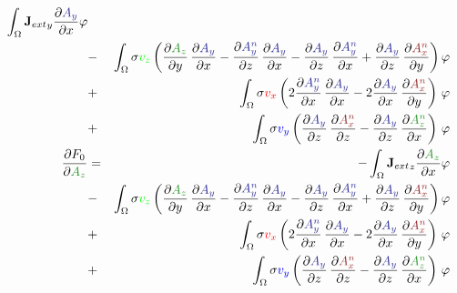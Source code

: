 \documentclass[smallextended]{svjour3}       %
\begin{document}
\begin{eqnarray}
			\int_{\Omega} {\mathbf{J}_{ext}}_y \frac{\partial \textcolor{darkBlue}{A_y}}{\partial x} \varphi
			\nonumber \\
			& - & \int_{\Omega} \sigma \textcolor{green}{v_z} \left(\frac{\partial \textcolor{darkGreen}{A_z}}{\partial y}\,\frac{\partial \textcolor{darkBlue}{A_y}}{\partial x} - \frac{\partial \textcolor{darkBlue}{A_y^n}}{\partial z}\,\frac{\partial \textcolor{darkBlue}{A_y}}{\partial x} - \frac{\partial \textcolor{darkBlue}{A_y}}{\partial z}\,\frac{\partial \textcolor{darkBlue}{A_y^n}}{\partial x} + \frac{\partial \textcolor{darkBlue}{A_y}}{\partial z}\,\frac{\partial \textcolor{darkRed}{A_x^n}}{\partial y} \right) \varphi \nonumber \\			
			& + &\int_{\Omega} \sigma \textcolor{red}{v_x} \left(2 \frac{\partial \textcolor{darkBlue}{A_y^n}}{\partial x}\,\frac{\partial \textcolor{darkBlue}{A_y}}{\partial x} - 2 \frac{\partial \textcolor{darkBlue}{A_y}}{\partial x}\,\frac{\partial \textcolor{darkRed}{A_x^n}}{\partial y}\right)\, \varphi \nonumber \\		
			& + & \int_{\Omega} \sigma \textcolor{blue}{v_y} \left(\frac{\partial \textcolor{darkBlue}{A_y}}{\partial z}\,\frac{\partial \textcolor{darkRed}{A_x^n}}{\partial z} - \frac{\partial \textcolor{darkBlue}{A_y}}{\partial z}\,\frac{\partial \textcolor{darkGreen}{A_z^n}}{\partial x} \right)\, \varphi \\			
			\frac{\partial F_0}{\partial \textcolor{darkGreen}{A_z}} & = &
			-\int_{\Omega} {\mathbf{J}_{ext}}_z \frac{\partial \textcolor{darkGreen}{A_z}}{\partial x} \varphi
			\nonumber \\
			& - & \int_{\Omega} \sigma \textcolor{green}{v_z} \left(\frac{\partial \textcolor{darkGreen}{A_z}}{\partial y}\,\frac{\partial \textcolor{darkBlue}{A_y}}{\partial x} - \frac{\partial \textcolor{darkBlue}{A_y^n}}{\partial z}\,\frac{\partial \textcolor{darkBlue}{A_y}}{\partial x} - \frac{\partial \textcolor{darkBlue}{A_y}}{\partial z}\,\frac{\partial \textcolor{darkBlue}{A_y^n}}{\partial x} + \frac{\partial \textcolor{darkBlue}{A_y}}{\partial z}\,\frac{\partial \textcolor{darkRed}{A_x^n}}{\partial y} \right) \varphi \nonumber \\			
			& + &\int_{\Omega} \sigma \textcolor{red}{v_x} \left(2 \frac{\partial \textcolor{darkBlue}{A_y^n}}{\partial x}\,\frac{\partial \textcolor{darkBlue}{A_y}}{\partial x} - 2 \frac{\partial \textcolor{darkBlue}{A_y}}{\partial x}\,\frac{\partial \textcolor{darkRed}{A_x^n}}{\partial y}\right)\, \varphi \nonumber \\		
			& + & \int_{\Omega} \sigma \textcolor{blue}{v_y} \left(\frac{\partial \textcolor{darkBlue}{A_y}}{\partial z}\,\frac{\partial \textcolor{darkRed}{A_x^n}}{\partial z} - \frac{\partial \textcolor{darkBlue}{A_y}}{\partial z}\,\frac{\partial \textcolor{darkGreen}{A_z^n}}{\partial x} \right)\, \varphi
		\end{eqnarray}
		
\end{document}
